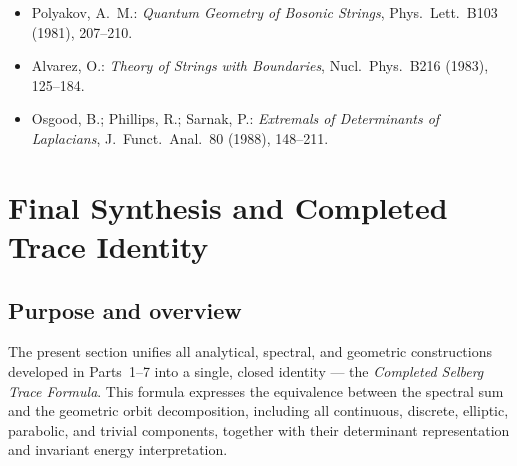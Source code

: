\begin{itemize}
  \item Polyakov, A.~M.: \emph{Quantum Geometry of Bosonic Strings}, Phys.\ Lett.\ B103 (1981), 207–210. %
  \item Alvarez, O.: \emph{Theory of Strings with Boundaries}, Nucl.\ Phys.\ B216 (1983), 125–184. %
  \item Osgood, B.; Phillips, R.; Sarnak, P.: \emph{Extremals of Determinants of Laplacians}, J.\ Funct.\ Anal.\ 80 (1988), 148–211. %
\end{itemize}


\section{Final Synthesis and Completed Trace Identity}
\label{sec:ch4-part8-synthesis} \relax \hspace{0pt}

\subsection{Purpose and overview}
\label{subsec:ch4-part8-overview} \relax

The present section unifies all analytical, spectral, and geometric constructions developed in Parts~1–7 into a single, closed identity — the \emph{Completed Selberg Trace Formula}.  
This formula expresses the equivalence between the spectral sum and the geometric orbit decomposition, including all continuous, discrete, elliptic, parabolic, and trivial components, together with their determinant representation and invariant energy interpretation.  

